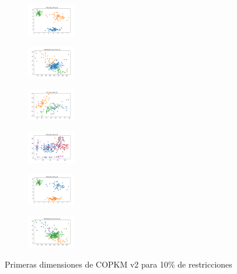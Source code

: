 \begin{figure}[H]
\begin{subfigure}
        \centering
        \includegraphics[width=0.234\textwidth]{img/am01mej/rand_set_const_10_49258669_clust.png}
    \end{subfigure}
    \hfill
    \begin{subfigure}
        \centering
        \includegraphics[width=0.234\textwidth]{img/am01mej/newthyroid_set_const_10_49258669_clust.png}
    \end{subfigure}
    \hfill
    \begin{subfigure}
        \centering
        \includegraphics[width=0.234\textwidth]{img/am01mej/iris_set_const_10_3773969821_clust.png}
    \end{subfigure}
    \hfill
    \begin{subfigure}
        \centering
        \includegraphics[width=0.234\textwidth]{img/am01mej/ecoli_set_const_10_3773969821_clust.png}
    \end{subfigure}
    \hfill
    \begin{subfigure}
        \centering
        \includegraphics[width=0.234\textwidth]{img/am01mej/rand_set_const_10_3773969821_clust.png}
    \end{subfigure}
    \hfill
    \begin{subfigure}
        \centering
        \includegraphics[width=0.234\textwidth]{img/am01mej/newthyroid_set_const_10_3773969821_clust.png}
    \end{subfigure}
    \caption{Primeras dimensiones de COPKM v2 para 10\% de restricciones}
\end{figure}


